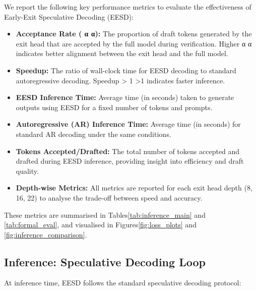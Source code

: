 \documentclass[11pt]{article}
\begin{document}
We report the following key performance metrics to evaluate the effectiveness of Early-Exit Speculative Decoding (EESD):
\begin{itemize}
\item \textbf{Acceptance Rate (
α
α):} The proportion of draft tokens generated by the exit head that are accepted by the full model during verification. Higher 
α
α indicates better alignment between the exit head and the full model.
\item \textbf{Speedup:} The ratio of wall-clock time for EESD decoding to standard autoregressive decoding. Speedup 
>
1
>1 indicates faster inference.
\item \textbf{EESD Inference Time:} Average time (in seconds) taken to generate outputs using EESD for a fixed number of tokens and prompts.
\item \textbf{Autoregressive (AR) Inference Time:} Average time (in seconds) for standard AR decoding under the same conditions.
\item \textbf{Tokens Accepted/Drafted:} The total number of tokens accepted and drafted during EESD inference, providing insight into efficiency and draft quality.
\item \textbf{Depth-wise Metrics:} All metrics are reported for each exit head depth (8, 16, 22) to analyse the trade-off between speed and accuracy.
\end{itemize}

These metrics are summarised in Tables\ref{tab:inference_main} and \ref{tab:formal_eval}, and visualised in Figures\ref{fig:loss_plots} and \ref{fig:inference_comparison}.


\subsection{Inference: Speculative Decoding Loop}

At inference time, EESD follows the standard speculative decoding protocol:
\end{document}
